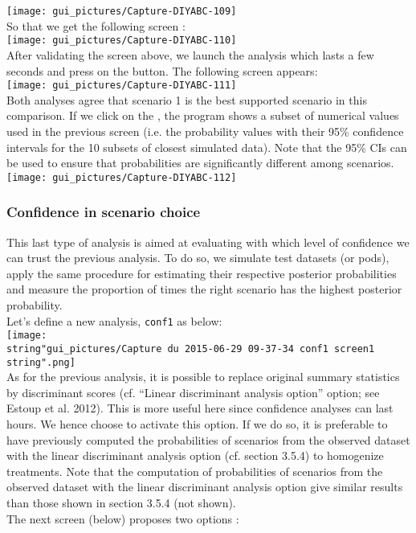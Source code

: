 \texttt{[image: gui\_pictures/Capture-DIYABC-109]} \\


So that we get the following screen :\\


\texttt{[image: gui\_pictures/Capture-DIYABC-110]} \\


After validating the screen above, we launch the analysis which lasts
a few seconds and press on the  button.
The following screen appears:\\


\texttt{[image: gui\_pictures/Capture-DIYABC-111]} \\


Both analyses agree that scenario 1 is the best supported scenario
in this comparison. If we click on the , the program shows a subset of numerical values used in
the previous screen (i.e. the probability values with their 95\% confidence
intervals for the 10 subsets of closest simulated data). Note that
the 95\% CIs can be used to ensure that probabilities are significantly
different among scenarios.\\


\texttt{[image: gui\_pictures/Capture-DIYABC-112]} \\



\subsubsection{Confidence in scenario choice}

This last type of analysis is aimed at evaluating with which level
of confidence we can trust the previous analysis. To do so, we simulate
test datasets (or pods), apply the same procedure for estimating their
respective posterior probabilities and measure the proportion of times
the right scenario has the highest posterior probability.\\
 Let's define a new analysis, \texttt{conf1} as below:\\


\texttt{[image: \\string"gui\_pictures/Capture du 2015-06-29 09-37-34 conf1 screen1\\string".png]}\\


As for the previous analysis, it is possible to replace original summary
statistics by discriminant scores (cf. ``Linear discriminant analysis
option'' option; see Estoup et al. 2012). This is more useful here
since confidence analyses can last hours. We hence choose to activate
this option. If we do so, it is preferable to have previously computed
the probabilities of scenarios from the observed dataset with the
linear discriminant analysis option (cf. section 3.5.4) to homogenize
treatments. Note that the computation of probabilities of scenarios
from the observed dataset with the linear discriminant analysis option
give similar results than those shown in section 3.5.4 (not shown).
\\
 The next screen (below) proposes two options :

